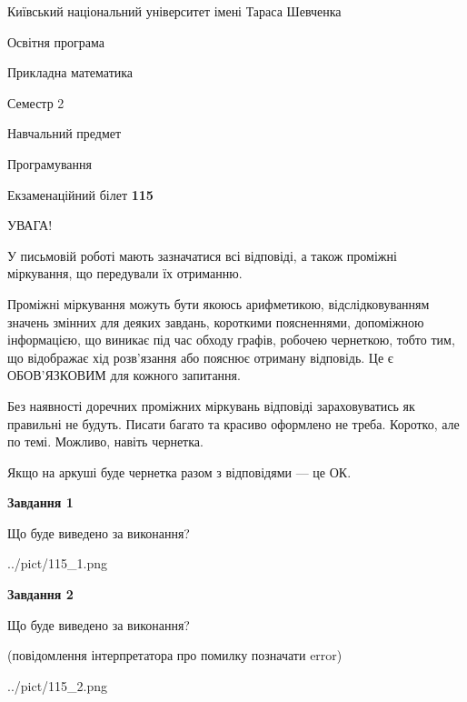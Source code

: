 \documentclass[12pt, ukrainian]{article}
\begin{document}
{{\begin {small}\par
{ \center  Київський національний університет імені Тараса Шевченка \par}
{\parbox {5 cm}{Освітня програма \hfill}{\parbox {7 cm}{Прикладна математика\hfill}}\parbox {6 cm}{\hfill Семестр 2}}\par
{\parbox {5 cm} {Навчальний предмет \hfill}\parbox {7 cm}{Програмування \hfill}\parbox {6cm}{\hfill}\par}\vspace{-7pt} \end{small}}{\center Екзаменаційний білет \No \textbf
{ 115 }\par}}
{
\begin {large}
УВАГА!

У письмовій роботі мають зазначатися всі відповіді, а також проміжні міркування, що передували їх отриманню.

Проміжні міркування можуть бути якоюсь арифметикою, відслідковуванням зна\-чень змінних для деяких завдань,
короткими поясненнями, допоміжною інформацією, що виникає під час обходу графів, робочею чернеткою,
тобто тим, що відображає хід розв’язання або пояснює отриману відповідь.
Це є ОБОВ’ЯЗКОВИМ для кожного запитання.

Без наявності доречних проміжних міркувань відповіді зараховуватись як правиль\-ні не будуть.
Писати багато та красиво оформлено не треба. Коротко, але по темі. Можли\-во, навіть чернетка.

Якщо на аркуші буде чернетка разом з відповідями --- це ОК.

\newpage

{\begin {center}\textbf{Завдання 1}\end {center}}\par
Що буде виведено за виконання?\par
\begin{center}
	{../pict/115_1.png}
\end{center}
\newpage

{\begin {center}\textbf{Завдання 2}\end {center}}\par
Що буде виведено за виконання?\par
 (повідомлення інтерпретатора про помилку позначати error)\par
\begin{center}
	{../pict/115_2.png}
\end{center}
\newpage


\end{large}}
\end{document}
